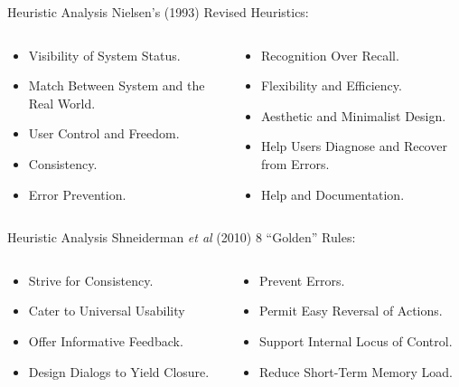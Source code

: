 \begin{frame}{Heuristic Analysis}
Nielsen's (1993) Revised Heuristics:

	\begin{columns}[onlytextwidth]
		\begin{column}{0.45\textwidth}
			\begin{itemize}
				\item Visibility of System Status.
				\item Match Between System and the Real World.
				\item User Control and Freedom.
				\item Consistency.
				\item Error Prevention.
			\end{itemize}
		\end{column}
		\begin{column}{0.45\textwidth}				
			\begin{itemize}
				\item Recognition Over Recall.
				\item Flexibility and Efficiency.
				\item Aesthetic and Minimalist Design.
				\item Help Users Diagnose and Recover from Errors.
				\item Help and Documentation.
			\end{itemize}
		\end{column}
	\end{columns}
\end{frame}

\begin{frame}{Heuristic Analysis}
Shneiderman \textit{et al} (2010) 8 ``Golden'' Rules:

	\begin{columns}[onlytextwidth]
		\begin{column}{0.45\textwidth}
			\begin{itemize}
				\item Strive for Consistency.
				\item Cater to Universal Usability
				\item Offer Informative Feedback.
				\item Design Dialogs to Yield Closure.
			\end{itemize}
		\end{column}
		\begin{column}{0.45\textwidth}				
			\begin{itemize}
				\item Prevent Errors.
				\item Permit Easy Reversal of Actions.
				\item Support Internal Locus of Control.
				\item Reduce Short-Term Memory Load.
			\end{itemize}
		\end{column}
	\end{columns}
\end{frame}

